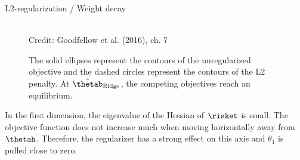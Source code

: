 \begin{vbframe}{L2-regularization / Weight decay}
\begin{figure}
\centering
{}
\tiny{\\ Credit: Goodfellow et al. (2016), ch. 7}
\caption{\footnotesize The solid ellipses represent the contours of the unregularized objective and the dashed circles represent the contours of the L2 penalty. At $\hat{\thetab}_{\text{Ridge}}$, the competing objectives reach an equilibrium.}
\end{figure}
\small
In the first dimension, the eigenvalue of the Hessian of $\risket$ is small. The objective function does not increase much when moving horizontally away from $\thetah$. Therefore, the regularizer has a strong effect on this axis and $\theta_1$ is pulled close to zero.
\framebreak


\end{vbframe}
